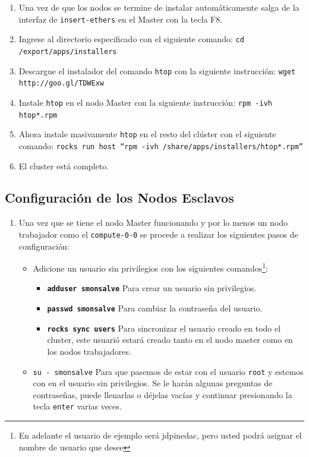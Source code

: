 \begin{enumerate}
\item Una vez de que los nodos se termine de instalar automáticamente salga de la interfaz de \texttt{insert-ethers} en el Master con la tecla F8.

\item Ingrese al directorio especificado con el siguiente comando: \texttt{cd /export/apps/installers}

\item Descargue el instalador del comando \texttt{htop} con la siguiente instrucción: \texttt{wget http://goo.gl/TDWExw}

\item Instale \texttt{htop} en el nodo Master con la siguiente instrucción: \texttt{rpm -ivh htop*.rpm}

\item Ahora instale masivamente \texttt{htop} en el resto del clúster con el siguiente comando: \texttt{rocks run host ``rpm -ivh /share/apps/installers/htop*.rpm''}

\item El cluster está completo.

\end{enumerate}

\subsection{Configuración de los Nodos Esclavos}

\begin{enumerate}
	\item Una vez que se tiene el nodo Master funcionando y por lo menos un nodo trabajador como el \texttt{compute-0-0} se procede a realizar los siguientes pasos de configuración:

	\begin{itemize}
	\item Adicione un usuario sin privilegios con los siguientes comandos\footnote{En adelante el usuario de ejemplo será jdpinedac, pero usted podrá asignar el nombre de usuario que desee}:

	\begin{itemize}
		\item \textbf{\texttt{adduser smonsalve}} Para crear un usuario sin privilegios.

		\item \textbf{\texttt{passwd smonsalve}} Para cambiar la contraseña del usuario.

		\item \textbf{\texttt{rocks sync users}} Para sincronizar el usuario creado en todo el cluster, este usuarió estará creado tanto en el nodo master como en los nodos trabajadores.
	\end{itemize}

	\item \texttt{su - smonsalve} Para que pasemos de estar con el usuario \texttt{root} y estemos con en el usuario sin privilegios. Se le harán algunas preguntas de contraseñas, puede llenarlas o déjelas vacías y continuar presionando la tecla \texttt{enter} varias veces.
	\end{itemize}
	
\end{enumerate}

